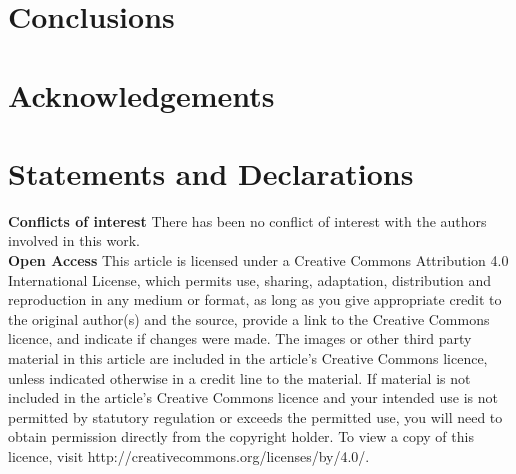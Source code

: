 \documentclass[default,iicol]{sn-jnl}
\begin{document}

\section{Conclusions}

\section{Acknowledgements}

\section{Statements and Declarations}
\small
\noindent\textbf{Conflicts of interest} There has been no conflict of interest with the
authors involved in this work. \\

\noindent\textbf{Open Access} This article is licensed under a Creative Commons Attribution 4.0 International License, which permits use, sharing, adaptation, distribution and reproduction in any medium or format, as long
as you give appropriate credit to the original author(s) and the source,
provide a link to the Creative Commons licence, and indicate if changes
were made. The images or other third party material in this article are
included in the article's Creative Commons licence, unless indicated
otherwise in a credit line to the material. If material is not included in
the article's Creative Commons licence and your intended use is not
permitted by statutory regulation or exceeds the permitted use, you will
need to obtain permission directly from the copyright holder. To view a
copy of this licence, visit http://creativecommons.org/licenses/by/4.0/.



\end{document}
